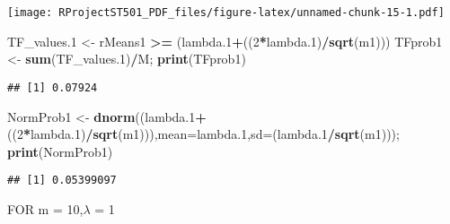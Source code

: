 \documentclass[
]{article}
\newenvironment{Shaded}{\begin{snugshade}}{\end{snugshade}}
\newcommand{\DataTypeTok}[1]{\textcolor[rgb]{0.13,0.29,0.53}{#1}}
\newcommand{\DecValTok}[1]{\textcolor[rgb]{0.00,0.00,0.81}{#1}}
\newcommand{\FloatTok}[1]{\textcolor[rgb]{0.00,0.00,0.81}{#1}}
\newcommand{\KeywordTok}[1]{\textcolor[rgb]{0.13,0.29,0.53}{\textbf{#1}}}
\newcommand{\NormalTok}[1]{#1}
\newcommand{\OperatorTok}[1]{\textcolor[rgb]{0.81,0.36,0.00}{\textbf{#1}}}
\newcommand{\StringTok}[1]{\textcolor[rgb]{0.31,0.60,0.02}{#1}}
\begin{document}
\texttt{[image: RProjectST501\_PDF\_files/figure-latex/unnamed-chunk-15-1.pdf]}

\begin{Shaded}
\begin{Highlighting}[]
\NormalTok{TF_values}\FloatTok{.1}\NormalTok{ <-}\StringTok{ }\NormalTok{rMeans1 }\OperatorTok{>=}\StringTok{ }\NormalTok{(lambda}\FloatTok{.1}\OperatorTok{+}\NormalTok{((}\DecValTok{2}\OperatorTok{*}\NormalTok{lambda}\FloatTok{.1}\NormalTok{)}\OperatorTok{/}\KeywordTok{sqrt}\NormalTok{(m1)))}
\NormalTok{TFprob1 <-}\StringTok{ }\KeywordTok{sum}\NormalTok{(TF_values}\FloatTok{.1}\NormalTok{)}\OperatorTok{/}\NormalTok{M; }\KeywordTok{print}\NormalTok{(TFprob1)}
\end{Highlighting}
\end{Shaded}

\begin{verbatim}
## [1] 0.07924
\end{verbatim}

\begin{Shaded}
\begin{Highlighting}[]
\NormalTok{NormProb1 <-}\StringTok{ }\KeywordTok{dnorm}\NormalTok{((lambda}\FloatTok{.1}\OperatorTok{+}\NormalTok{((}\DecValTok{2}\OperatorTok{*}\NormalTok{lambda}\FloatTok{.1}\NormalTok{)}\OperatorTok{/}\KeywordTok{sqrt}\NormalTok{(m1))),}\DataTypeTok{mean=}\NormalTok{lambda}\FloatTok{.1}\NormalTok{,}\DataTypeTok{sd=}\NormalTok{(lambda}\FloatTok{.1}\OperatorTok{/}\KeywordTok{sqrt}\NormalTok{(m1))); }\KeywordTok{print}\NormalTok{(NormProb1)}
\end{Highlighting}
\end{Shaded}

\begin{verbatim}
## [1] 0.05399097
\end{verbatim}

FOR m = 10,\(\lambda\) = 1
\end{document}
